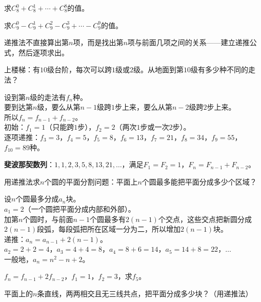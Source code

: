 \begin{exercise}
\item 求$C_8^0 + C_8^1 + \cdots + C_8^8$的值。
\item 求$C_9^0 - C_9^1 + C_9^2 - C_9^3 + \cdots - C_9^9$的值。
\end{exercise}


递推法不直接算出第$n$项，而是找出第$n$项与前面几项之间的关系——建立递推公式，然后逐项求出。

\begin{example}
上楼梯：有$10$级台阶，每次可以跨$1$级或$2$级。从地面到第$10$级有多少种不同的走法？
\end{example}
\begin{solution}
设到第$n$级的走法有$f_n$种。\\
要到达第$n$级，要么从第$n-1$级跨$1$步上来，要么从第$n-2$级跨$2$步上来。\\
所以$f_n = f_{n-1} + f_{n-2}$。\\
初始：$f_1=1$（只能跨$1$步），$f_2=2$（两次$1$步或一次$2$步）。\\
逐项递推：$f_3=3$，$f_4=5$，$f_5=8$，$f_6=13$，$f_7=21$，$f_8=34$，$f_9=55$，$f_{10}=89$种。
\end{solution}

\textbf{斐波那契数列}：$1,1,2,3,5,8,13,21,\dots$，满足$F_1=F_2=1$，$F_n=F_{n-1}+F_{n-2}$。

\begin{example}
用递推法求$n$个圆的平面分割问题：平面上$n$个圆最多能把平面分成多少个区域？
\end{example}
\begin{solution}
设$n$个圆最多分成$a_n$块。\\
$a_1=2$（一个圆把平面分成内部和外部）。\\
加第$n$个圆时，与前面$n-1$个圆最多有$2(n-1)$个交点，这些交点把新圆分成$2(n-1)$段弧，每段弧把所在区域一分为二，所以增加$2(n-1)$块。\\
递推：$a_n = a_{n-1} + 2(n-1)$。\\
$a_2 = 2 + 2 = 4$，$a_3 = 4 + 4 = 8$，$a_4 = 8 + 6 = 14$，$a_5 = 14 + 8 = 22$，$\dots$\\
一般地，$a_n = n^2 - n + 2$。
\end{solution}

\begin{exercise}
\item $f_n = f_{n-1} + 2f_{n-2}$，$f_1=1$，$f_2=3$，求$f_5$。
\item 平面上的$n$条直线，两两相交且无三线共点，把平面分成多少块？（用递推法）
\end{exercise}

